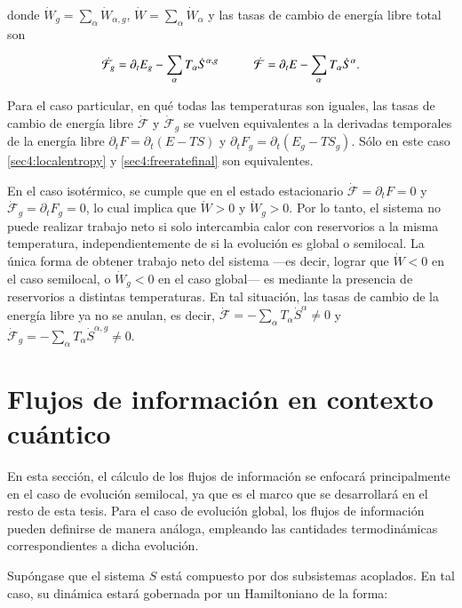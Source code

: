 donde $\dot{W}_{g} = \sum_{\alpha}\dot{W}_{\alpha,g}$, $\dot{W} = \sum_{\alpha}\dot{W}_{\alpha}$  y las tasas de cambio de energía libre total son

\begin{equation*}
    \dot{\mathcal{F}}_{g} = \partial_{t}E_{g} - \sum_{\alpha}T_{\alpha} \dot{S}^{\alpha,g} \hspace{10mm}
    \dot{\mathcal{F}} = \partial_{t}E - \sum_{\alpha}T_{\alpha} \dot{S}^{\alpha}.
\end{equation*}

Para el caso particular, en qué todas las temperaturas son iguales, las tasas de cambio de energía libre $\dot{\mathcal{F}}$ y $\dot{\mathcal{F}}_{g}$ se vuelven equivalentes a la derivadas temporales de la energía libre $\partial_{t}F = \partial_{t}(E-TS)$ y $\partial_{t}F_{g} = \partial_{t}(E_{g}-TS_{g})$. Sólo en este caso \ref{sec4:localentropy} y \ref{sec4:freeratefinal} son equivalentes.

En el caso isotérmico, se cumple que en el estado estacionario $\dot{\mathcal{F}} = \partial_{t}F = 0$ y $\dot{\mathcal{F}}_{g} = \partial_{t}F_{g} = 0$, lo cual implica que $\dot{W} > 0$ y $\dot{W}_{g} > 0$. Por lo tanto, el sistema no puede realizar trabajo neto si solo intercambia calor con reservorios a la misma temperatura, independientemente de si la evolución es global o semilocal. La única forma de obtener trabajo neto del sistema —es decir, lograr que $\dot{W} < 0$ en el caso semilocal, o $\dot{W}_{g} < 0$ en el caso global— es mediante la presencia de reservorios a distintas temperaturas. En tal situación, las tasas de cambio de la energía libre ya no se anulan, es decir, $\dot{\mathcal{F}} = - \sum_{\alpha} T_{\alpha} \dot{S}^{\alpha} \neq 0$ y $\dot{\mathcal{F}}_{g} = - \sum_{\alpha} T_{\alpha} \dot{S}^{\alpha,g} \neq 0$.

\section{Flujos de información en contexto cuántico}
En esta sección, el cálculo de los flujos de información se enfocará principalmente en el caso de evolución semilocal, ya que es el marco que se desarrollará en el resto de esta tesis. Para el caso de evolución global, los flujos de información pueden definirse de manera análoga, empleando las cantidades termodinámicas correspondientes a dicha evolución.

Supóngase que el sistema $S$ está compuesto por dos subsistemas acoplados. En tal caso, su dinámica estará gobernada por un Hamiltoniano de la forma:

